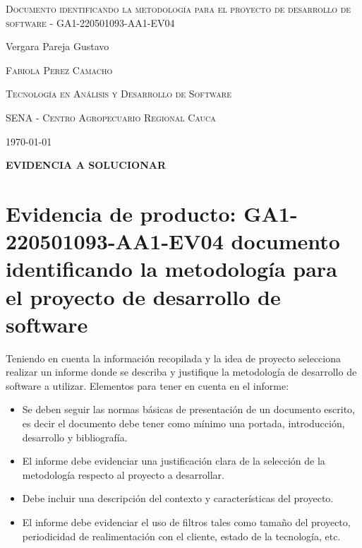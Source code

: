 \documentclass{article}
\author{Gustavo Vergara}
\theoremstyle{mytheoremstyle}
\theoremstyle{mytheoremstyle}
\theoremstyle{myproblemstyle}
\begin{document}
\pgfplotsset{compat=1.18}

\begin{titlepage}
    \centering
    \vspace{2.5cm}
    {\scshape \Large Documento identificando la metodología para el proyecto de desarrollo de software - GA1-220501093-AA1-EV04 \par}
    \vspace{5cm}
    \textbf\large\scshape{\par}
         \vspace{0.5cm}
         
    {\Large Vergara Pareja Gustavo\par}
    \vspace{5cm}
    {\scshape\Large Fabiola Perez Camacho\par}
    \vspace{0.3cm}
    {\scshape\Large Tecnología en Análisis y Desarrollo de Software \par}
    \vspace{0.3cm}
    {\scshape\Large SENA - Centro Agropecuario Regional Cauca\par}
    \vspace{0.3cm}
    {\Large \today \par}
    \end{titlepage}

\begin{flushleft}
    \large \textbf{EVIDENCIA A SOLUCIONAR}\\
    \vspace{0.1cm}
    \section*{Evidencia de producto: GA1-220501093-AA1-EV04 documento identificando la metodología para el proyecto de desarrollo de software}
    
Teniendo en cuenta la información recopilada y la idea de proyecto selecciona realizar un informe donde se describa y justifique la metodología de desarrollo de software a utilizar.
Elementos para tener en cuenta en el informe:
\begin{itemize}
    \item Se deben seguir las normas básicas de presentación de un documento escrito, es decir el documento debe tener como mínimo una portada, introducción, desarrollo y bibliografía.
    \item El informe debe evidenciar una justificación clara de la selección de la metodología respecto al proyecto a desarrollar.
    \item Debe incluir una descripción del contexto y características del proyecto.
    \item El informe debe evidenciar el uso de filtros tales como tamaño del proyecto, periodicidad de realimentación con el cliente, estado de la tecnología, etc.
\end{itemize}   
    \end{flushleft}
    \newpage
    \tableofcontents
    \newpage
\end{document}
